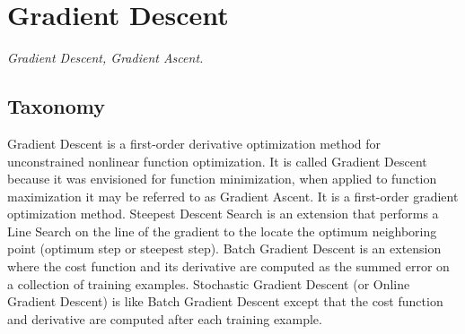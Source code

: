 
\section{Gradient Descent} 
\label{sec:gradient_descent}

\emph{Gradient Descent, Gradient Ascent.}

\subsection{Taxonomy}
Gradient Descent is a first-order derivative optimization method for unconstrained nonlinear function optimization. It is called Gradient Descent because it was envisioned for function minimization, when applied to function maximization it may be referred to as Gradient Ascent. It is a first-order gradient optimization method.
Steepest Descent Search is an extension that performs a Line Search on the line of the gradient to the locate the optimum neighboring point (optimum step or steepest step).
Batch Gradient Descent is an extension where the cost function and its derivative are computed as the summed error on a collection of training examples.
Stochastic Gradient Descent (or Online Gradient Descent) is like Batch Gradient Descent except that the cost function and derivative are computed after each training example.

